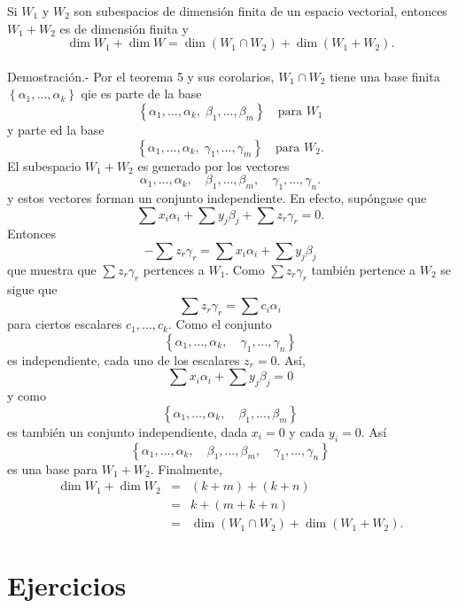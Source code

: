 \begin{teo}
    Si $W_1$ y $W_2$ son subespacios de dimensión finita de un espacio vectorial, entonces $W_1+W_2$ es de dimensión finita y
    $$\dim W_1+\dim W = \dim (W_1\cap W_2)+\dim (W_1+W_2).$$\\
	Demostración.-\; Por el teorema 5 y sus corolarios, $W_1\cap W_2$ tiene una base finita $\left\{\alpha_1,\ldots,\alpha_k\right\}$ qie es parte de la base
	$$\left\{\alpha_1,\ldots,\alpha_k,\; \beta_1,\ldots,\beta_m\right\}\quad \mbox{para }W_1$$
	y parte ed la base
	$$\left\{\alpha_1,\ldots,\alpha_k,\; \gamma_1,\ldots,\gamma_m\right\}\quad \mbox{para }W_2.$$
	El subespacio $W_1+W_2$ es generado por los vectores
	$$\alpha_1,\ldots,\alpha_k,\quad \beta_1,\ldots,\beta_m,\quad \gamma_1,\ldots,\gamma_n.$$
	y estos vectores forman un conjunto independiente. En efecto, supóngase que 
	$$\sum x_i\alpha_i + \sum y_j\beta_j + \sum z_r\gamma_r=0.$$
	Entonces 
	$$-\sum z_r\gamma_r = \sum x_i\alpha_i+\sum y_j\beta_j$$
	que muestra que $\sum z_r\gamma_r$ pertences a $W_1$. Como $\sum z_r\gamma_r$ también pertence a $W_2$ se sigue que
	$$\sum z_r\gamma_r = \sum c_i\alpha_i$$
	para ciertos escalares $c_1,\ldots,c_k$. Como el conjunto 
	$$\left\{\alpha_1,\ldots,\alpha_k,\quad \gamma_1,\ldots,\gamma_n\right\}$$
	es independiente, cada uno de los escalares $z_r=0$. Así, 
	$$\sum x_i\alpha_i + \sum y_j\beta_j=0$$
	y como 
	$$\left\{\alpha_1,\ldots,\alpha_k,\quad \beta_1,\ldots,\beta_m\right\}$$
	es también un conjunto independiente, dada $x_i=0$ y cada $y_i=0$. Así
	$$\left\{\alpha_1,\ldots,\alpha_k,\quad \beta_1,\ldots,\beta_m,\quad \gamma_1,\ldots,\gamma_n\right\}$$
	es una base para $W_1+W_2$. Finalmente,
	$$
	\begin{array}{rcl}
	    \dim W_1+\dim W_2 &=& (k+m)+(k+n)\\
			      &=& k+(m+k+n)\\
			      &=& \dim(W_1\cap W_2)+\dim(W_1+W_2).
	\end{array}
	$$
\end{teo}


\section*{Ejercicios}

